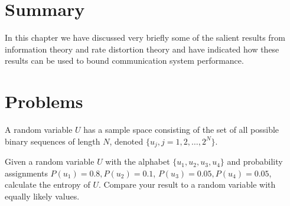 \section*{Summary}

In this chapter we have discussed very briefly some of the salient
results from information theory and rate distortion theory and have
indicated how these results can be used to bound communication system
performance.


\section*{Problems}
%

\begin{problems}

\item
A random variable $U$ has a sample space consisting of the set
of all possible binary sequences of length $N$, denoted
$\{u_j, j=1, 2, \ldots, 2^N \}$.

\item
Given a random variable $U$ with the alphabet $\{ u_1, u_2, u_3, u_4 \}$
and probability assignments $P(u_1) = 0.8, P(u_2)=0.1$,
$P(u_3) = 0.05, P(u_4)=0.05$, calculate the entropy of $U$.
Compare your result to a random variable with equally likely values.

\end{problems}

\clearpage

